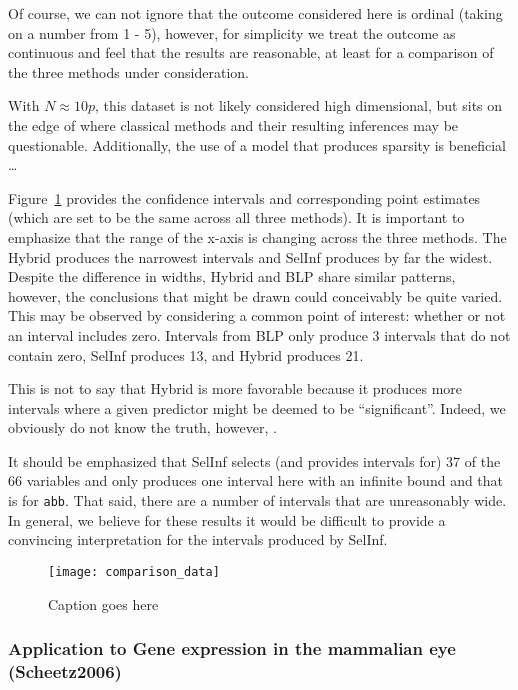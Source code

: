 Of course, we can not ignore that the outcome considered here is ordinal (taking on a number from 1 - 5), however, for simplicity we treat the outcome as continuous and feel that the results are reasonable, at least for a comparison of the three methods under consideration.

With $N \approx 10p$, this dataset is not likely considered high dimensional, but sits on the edge of where classical methods and their resulting inferences may be questionable. Additionally, the use of a model that produces sparsity is beneficial \dots

Figure~\ref{Fig:comparison_data_whoari} provides the confidence intervals and corresponding point estimates (which are set to be the same across all three methods). It is important to emphasize that the range of the x-axis is changing across the three methods. The Hybrid produces the narrowest intervals and SelInf produces by far the widest. Despite the difference in widths, Hybrid and BLP share similar patterns, however, the conclusions that might be drawn could conceivably be quite varied. This may be observed by considering a common point of interest: whether or not an interval includes zero. Intervals from BLP only produce 3 intervals that do not contain zero, SelInf produces 13, and Hybrid produces 21.

This is not to say that Hybrid is more favorable because it produces more intervals where a given predictor might be deemed to be ``significant''. Indeed, we obviously do not know the truth, however, .

It should be emphasized that SelInf selects (and provides intervals for) 37 of the 66 variables and only produces one interval here with an infinite bound and that is for \texttt{abb}. That said, there are a number of intervals that are unreasonably wide. In general, we believe for these results it would be difficult to provide a convincing interpretation for the intervals produced by SelInf.

\begin{figure}[hbtp]
  \texttt{[image: comparison\_data]}
  \caption{\label{Fig:comparison_data_whoari} Caption goes here}
\end{figure}

\subsubsection{Application to Gene expression in the mammalian eye (Scheetz2006)}\label{Sec:Scheetz2006}

